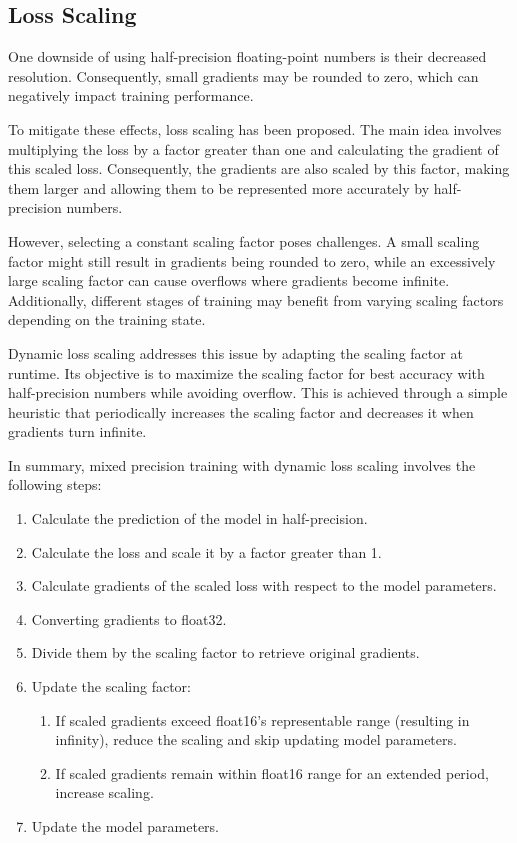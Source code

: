 \documentclass[copyright, logo]{dsme}
\begin{document}
\subsection{Loss Scaling}
One downside of using half-precision floating-point numbers is their decreased resolution. 
Consequently, small gradients may be rounded to zero, which can negatively impact training performance.

To mitigate these effects, loss scaling has been proposed. 
The main idea involves multiplying the loss by a factor greater than one and calculating the gradient of this scaled loss. 
Consequently, the gradients are also scaled by this factor, making them larger and allowing them to be represented more accurately by half-precision numbers.

However, selecting a constant scaling factor poses challenges. 
A small scaling factor might still result in gradients being rounded to zero, while an excessively large scaling factor can cause overflows where gradients become infinite. 
Additionally, different stages of training may benefit from varying scaling factors depending on the training state.

Dynamic loss scaling addresses this issue by adapting the scaling factor at runtime.
Its objective is to maximize the scaling factor for best accuracy with half-precision numbers while avoiding overflow. 
This is achieved through a simple heuristic that periodically increases the scaling factor and decreases it when gradients turn infinite.

In summary, mixed precision training with dynamic loss scaling involves the following steps:
\begin{enumerate}
    \item Calculate the prediction of the model in half-precision.
    \item Calculate the loss and scale it by a factor greater than 1.
    \item Calculate gradients of the scaled loss with respect to the model parameters.
    \item Converting gradients to float32.
    \item Divide them by the scaling factor to retrieve original gradients.
    \item Update the scaling factor:
    \begin{enumerate}[label=(\alph*)]
        \item If scaled gradients exceed float16's representable range (resulting in infinity), reduce the scaling and skip updating model parameters. 
        \item If scaled gradients remain within float16 range for an extended period, increase scaling.
    \end{enumerate}
    \item Update the model parameters.
\end{enumerate}
\end{document}
